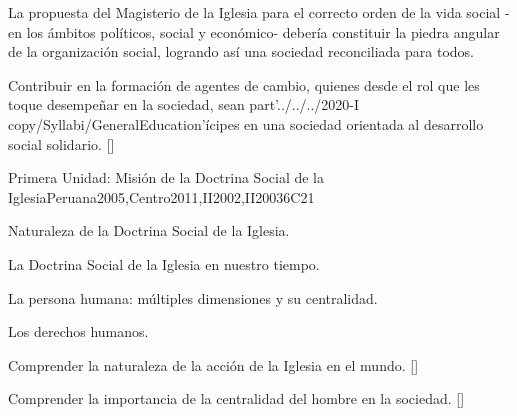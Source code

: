 \begin{syllabus}


\begin{justification}
La propuesta del Magisterio de la Iglesia para el correcto orden de la vida social -en los ámbitos políticos, social y económico- debería constituir la piedra angular de la organización social, logrando así una sociedad reconciliada para todos.
\end{justification}

\begin{goals}
\item Contribuir en la formación de agentes de cambio, quienes desde el rol que les toque desempeñar en la sociedad, sean part'../../../2020-I copy/Syllabi/GeneralEducation'ícipes en una sociedad orientada al desarrollo social solidario. [\Usage]
\end{goals}


\begin{unit}{}{Primera Unidad: Misión de la Doctrina Social de la Iglesia}{Peruana2005,Centro2011,II2002,II2003}{6}{C21}
\begin{topics}
	\item Naturaleza de la Doctrina Social de la Iglesia.
	\item La Doctrina Social de la Iglesia en nuestro tiempo.
	\item La persona humana: múltiples dimensiones y su centralidad.
	\item Los derechos humanos.
\end{topics}
\begin{learningoutcomes}
	\item Comprender la naturaleza de la acción de la Iglesia en el mundo. [\Familiarity]
	\item Comprender la importancia de la centralidad del hombre en la sociedad. [\Familiarity]
\end{learningoutcomes}
\end{unit}


\end{syllabus}
